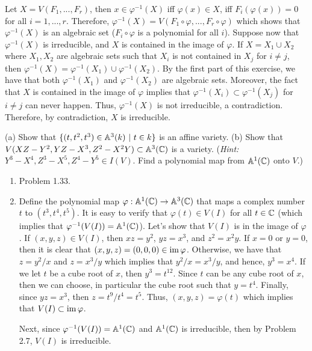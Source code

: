 \begin{solution}
    Let $X = V(F_1, ..., F_r)$, then $x \in \varphi^{-1}(X)$ iff $\varphi(x) \in X$, iff $F_i(\varphi(x)) = 0$ for all $i = 1, ..., r$. Therefore, $\varphi^{-1}(X) = V(F_1\circ \varphi, ..., F_r \circ \varphi)$ which shows that $\varphi^{-1}(X)$ is an algebraic set ($F_i \circ \varphi$ is a polynomial for all $i$). Suppose now that $\varphi^{-1}(X)$ is irreducible, and $X$ is contained in the image of $\varphi$. If $X = X_1 \cup X_2$ where $X_1, X_2$ are algebraic sets such that $X_i$ is not contained in $X_j$ for $i \neq j$, then $\varphi^{-1}(X) = \varphi^{-1}(X_1) \cup \varphi^{-1}(X_2)$. By the first part of this exercise, we have that both $\varphi^{-1}(X_1)$ and $\varphi^{-1}(X_2)$ are algebraic sets. Moreover, the fact that $X$ is contained in the image of $\varphi$ implies that $\varphi^{-1}(X_i) \subset \varphi^{-1}(X_j)$ for $i \neq j$ can never happen. Thus, $\varphi^{-1}(X)$ is not irreducible, a contradiction. Therefore, by contradiction, $X$ is irreducible. \\
\end{solution}

\begin{exercise}
    (a) Show that $\{(t,t^2, t^3) \in \A^3(k) \ | \ t\in k\}$ is an affine variety. (b) Show that $V(XZ - Y^2, YZ - X^3, Z^2 - X^2Y) \subset \mathbb{A}^3(\mathbb{C})$ is a variety. (\textit{Hint:} $Y^3 - X^4, Z^3 - X^5, Z^4 - Y^5 \in I(V)$. Find a polynomial map from $\mathbb{A}^1(\mathbb{C})$ onto $V$.) \\
\end{exercise}

\begin{solution}
    \begin{enumerate}[label=(\alph*)]
        \item Problem 1.33.
        \item Define the polynomial map $\varphi: \mathbb{A}^1(\mathbb{C}) \to \mathbb{A}^3(\mathbb{C})$ that maps a complex number $t$ to $(t^3, t^4, t^5)$. It is easy to verify that $\varphi(t) \in V(I)$ for all $t \in \mathbb{C}$ (which implies that $\varphi^{-1}(V(I)) = \mathbb{A}^1(\mathbb{C})$). Let's show that $V(I)$ is in the image of $\varphi$. If $(x,y,z) \in V(I)$, then $xz = y^2$, $yz = x^3$, and $z^2 = x^2y$. If $x = 0$ or $y = 0$, then it is clear that $(x,y,z) = (0,0,0) \in \operatorname{im} \varphi$. Otherwise, we have that $z = y^2/x$ and $z = x^3/y$ which implies that $y^2/x = x^3/y$, and hence, $y^3 = x^4$. If we let $t$ be a cube root of $x$, then $y^3 = t^{12}$. Since $t$ can be any cube root of $x$, then we can choose, in particular the cube root such that $y = t^4$. Finally, since $yz = x^3$, then $z = t^9/t^4 = t^5$. Thus, $(x,y,z) = \varphi(t)$ which implies that $V(I) \subset \operatorname{im} \varphi$. 
        
        Next, since $\varphi^{-1}(V(I)) = \mathbb{A}^1(\mathbb{C})$ and $\mathbb{A}^1(\mathbb{C})$ is irreducible, then by Problem 2.7, $V(I)$ is irreducible. \\
    \end{enumerate}
\end{solution}

